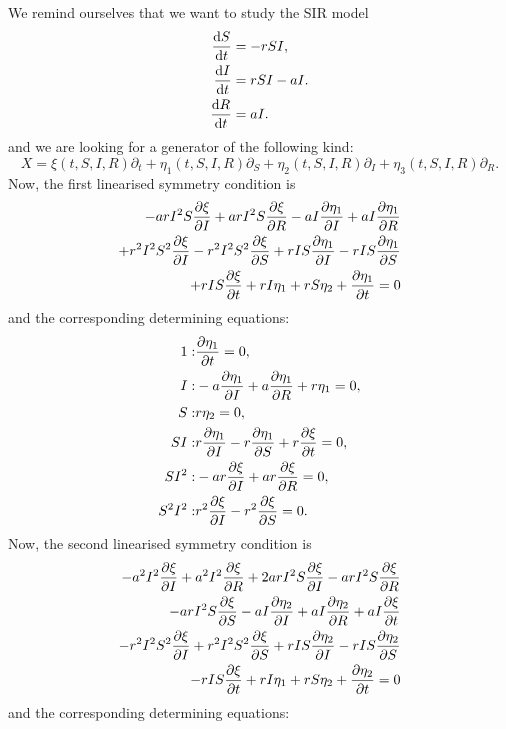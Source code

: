 We remind ourselves that we want to study the SIR model
\begin{equation*}
  \begin{split}
    \dv{S}{t}&=-rSI,\\
    \dv{I}{t}&=rSI-aI.\\
    \dv{R}{t}&=aI.\\    
    \end{split}
  \end{equation*}
  and we are looking for a generator of the following kind:
\begin{equation}
X=\xi(t,S,I,R)\partial_t+\eta_1(t,S,I,R)\partial_S+\eta_2(t,S,I,R)\partial_I+\eta_3(t,S,I,R)\partial_R.
\end{equation}
Now, the first linearised symmetry condition is
\begin{align}
  - a r I^{2} S \pdv{\xi}{I} + a r I^{2} S \pdv{\xi}{R} - a I \pdv{\eta_1}{I} + a I \pdv{\eta_1}{R}&\nonumber\\
  + r^{2} I^{2} S^{2} \pdv{\xi}{I} - r^{2} I^{2} S^{2} \pdv{\xi}{S} + r I S \pdv{\eta_1}{I} - r I S \pdv{\eta_1}{S} &\nonumber\\
  + r I S \pdv{\xi}{t} + r I \eta_1 + r S \eta_2 + \pdv{\eta_1}{t}=0\label{eq:SIR_lin_sym_1}
\end{align}
and the corresponding determining equations:
\begin{align}
1:&\pdv{\eta_1}{t}=0,\\
I:&- a \pdv{\eta_1}{I} + a \pdv{\eta_1}{R} + r \eta_1=0,\\
S:&r \eta_2=0,\\
S I:&r \pdv{\eta_1}{I} - r \pdv{\eta_1}{S} + r \pdv{\xi}{t}=0,\\
S I^{2}:&- a r \pdv{\xi}{I} + a r \pdv{\xi}{R}=0,\\
S^{2} I^{2}:&r^{2} \pdv{\xi}{I} - r^{2} \pdv{\xi}{S}=0.\\
\end{align}
Now, the second linearised symmetry condition is
\begin{align}
  - a^{2} I^{2} \pdv{\xi}{I} + a^{2} I^{2} \pdv{\xi}{R} + 2 a r I^{2} S \pdv{\xi}{I} - a r I^{2} S \pdv{\xi}{R}&\nonumber\\
  - a r I^{2} S \pdv{\xi}{S} - a I \pdv{\eta_2}{I} + a I \pdv{\eta_2}{R} + a I \pdv{\xi}{t}&\nonumber\\
  - r^{2} I^{2} S^{2} \pdv{\xi}{I} + r^{2} I^{2} S^{2} \pdv{\xi}{S} + r I S \pdv{\eta_2}{I} - r I S \pdv{\eta_2}{S}&\nonumber\\
  - r I S \pdv{\xi}{t} + r I \eta_1 + r S \eta_2 + \pdv{\eta_2}{t}=0\label{eq:SIR_lin_sym_2}
\end{align}
and the corresponding determining equations:


